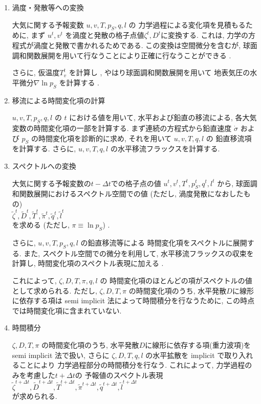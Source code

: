 \begin{enumerate}
\begin{enumerate}
\item 渦度・発散等への変換 

大気に関する予報変数 $u, v, T, p_S, q, l$ の
力学過程による変化項を見積もるために, まず
$u^{t}, v^{t}$ を渦度と発散の格子点値$\zeta^{t},D^{t}$に変換する.
これは, 力学の方程式が渦度と発散で書かれるためである.
この変換は空間微分を含むが,
球面調和関数展開を用いて行なうことにより正確に行なうことができる 
.

さらに, 仮温度$T_v^{t}$ を計算し ,
やはり球面調和関数展開を用いて
地表気圧の水平微分$\nabla \ln p_S$ を計算する .


\item 移流による時間変化項の計算 

$u, v, T, p_S, q, l$ の $t$ における値を用いて,
水平および鉛直の移流による,
各大気変数の時間変化項の一部を計算する.
まず連続の方程式から鉛直速度 $\dot{\sigma}$ および
$p_S$ の時間変化項を診断的に求め,
それを用いて $u, v, T, q, l$ の 鉛直移流項を計算する.
さらに, $u, v, T, q, l$ の水平移流フラックスを計算する.

\item スペクトルへの変換 

大気に関する予報変数の$t-\Delta t$での格子点の値
$u^{t}, v^{t}, T^{t}, p_S^{t}, q^{t}, l^{t}$  から, 
球面調和関数展開におけるスペクトル空間での値
(ただし, 渦度発散になおしたもの) \\
$\tilde{\zeta}^{t}, \tilde{D}^{t}, \tilde{T}^{t}, 
\tilde{\pi}^{t}, \tilde{q}^{t}, \tilde{l}^{t}$ \\
を求める (ただし, $\pi \equiv \ln p_S$) .

さらに, $u, v, T, p_S, q, l$ の鉛直移流等による
時間変化項をスペクトルに展開する.
また, スペクトル空間での微分を利用して,
水平移流フラックスの収束を計算し, 
時間変化項のスペクトル表現に加える .

これによって, $\zeta, D, T, \pi, q, l$ の
時間変化項のほとんどの項がスペクトルの値として求められる.
ただし, $\zeta, D, T, \pi$ の時間変化項のうち,
水平発散$D$に線形に依存する項は
semi implicit 法によって時間積分を行なうために,
この時点では時間変化項に含まれていない.

\item 時間積分 

$\zeta, D, T, \pi$ の時間変化項のうち,
水平発散$D$に線形に依存する項(重力波項)を
semi implicit 法で扱い,
さらに $\zeta, D, T, q, l$ の水平拡散を
implicit で取り入れることにより
力学過程部分の時間積分を行なう. 
これによって, 力学過程のみを考慮した$t+\Delta t$の
予報値のスペクトル表現 \\
$\tilde{\zeta}^{t+\Delta t}, \tilde{D}^{t+\Delta t}, 
\tilde{T}^{t+\Delta t}, \tilde{\pi}^{t+\Delta t}, 
\tilde{q}^{t+\Delta t}, \tilde{l}^{t+\Delta t}$  \\
が求められる.


\end{enumerate}
\end{enumerate}
